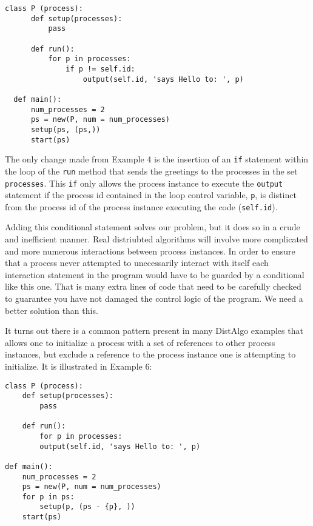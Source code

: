 \documentclass[11pt]{article}
\begin{document}
\begin{lstlisting}[caption={hello\_world05.da - Excluding Self-References, the Ugly Way}, label={lst:hw05}]
  class P (process):
      def setup(processes):
          pass

      def run():
          for p in processes:
              if p != self.id:
                  output(self.id, 'says Hello to: ', p)

  def main():
      num_processes = 2
      ps = new(P, num = num_processes)
      setup(ps, (ps,))
      start(ps)
\end{lstlisting}

The only change made from Example 4 is the insertion of an \texttt{if}
statement within the loop of the \texttt{run} method that sends the greetings
to the processes in the set \texttt{processes}. This \texttt{if} only allows
the process instance to execute the \texttt{output} statement if the process id
contained in the loop control variable, \texttt{p}, is distinct from the
process id of the process instance executing the code (\texttt{self.id}).

Adding this conditional statement solves our problem, but it does so in a crude
and inefficient manner. Real distriubted algorithms will involve more
complicated and more numerous interactions between process instances. In order
to ensure that a process never attempted to unecessarily interact with itself
each interaction statement in the program would have to be guarded by a
conditional like this one. That is many extra lines of code that need to be
carefully checked to guarantee you have not damaged the control logic of the
program. We need a better solution than this.

It turns out there is a common pattern present in many DistAlgo examples that
allows one to initialize a process with a set of references to other process
instances, but exclude a reference to the process instance one is attempting to
initialize. It is illustrated in Example 6:

\begin{lstlisting}[caption={hello\_world06.da - Excluding Self-References, the Nice Way}, label={lst:hw06}]
class P (process):
    def setup(processes):
        pass

    def run():
        for p in processes:
        output(self.id, 'says Hello to: ', p)

def main():
    num_processes = 2
    ps = new(P, num = num_processes)
    for p in ps:
        setup(p, (ps - {p}, ))
    start(ps)
\end{lstlisting}
\end{document}
